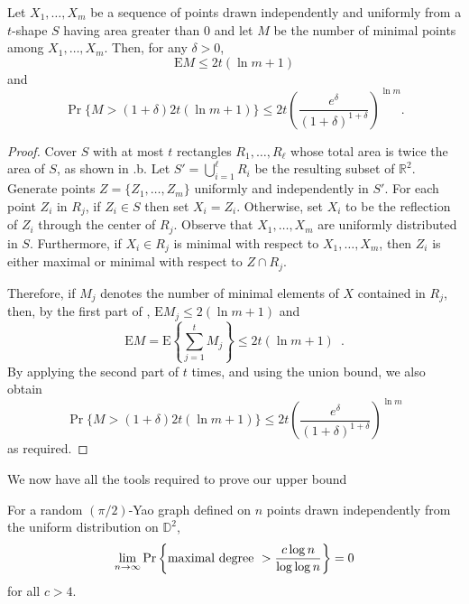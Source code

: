 \documentclass[lotsofwhite,charterfonts]{patmorin}
\newcommand{\RR}{\mathbb{R}}
\newcommand{\D}{\mathbb{D}}
\newcommand{\PROB}{\Pr}
\newcommand{\EXP}{\mathrm{E}}
\begin{document}
\begin{lem}
  Let $X_1,\ldots,X_m$ be a sequence of points drawn independently and
  uniformly from a $t$-shape $S$ having area greater than
  0 and let $M$ be the number of minimal points
  among $X_1,\ldots,X_m$.  Then, for any $\delta >0$,
  \begin{equation}
    \EXP{M} \le 2t(\ln m + 1)
  \end{equation}
  and 
  \begin{equation}
    \PROB\{M>(1+\delta)2t(\ln m+1)\} 
        \le 2t\left(\frac{e^\delta}{(1+\delta)^{1+\delta}}\right)^{\ln m} .
  \end{equation}
\end{lem}

\begin{proof}
Cover $S$ with at most $t$ rectangles $R_1,\ldots,R_\ell$ whose total area
is twice the area of $S$, as shown in .b.  Let
$S'=\bigcup_{i=1}^\ell R_i$ be the resulting subset of $\RR^2$.  Generate
points $Z=\{Z_1,\ldots,Z_m\}$ uniformly and independently in $S'$.  For each
point $Z_i$ in $R_j$, if $Z_i\in S$ then set $X_i=Z_i$.  Otherwise, set
$X_i$ to be the reflection of $Z_i$ through the center of $R_j$.  Observe
that $X_1,\ldots,X_m$ are uniformly distributed in $S$.  Furthermore, if
$X_i\in R_j$ is minimal with respect to $X_1,\ldots,X_m$, then $Z_i$ is either
maximal or minimal with respect to $Z \cap R_j$.

Therefore, if $M_j$ denotes the number of minimal elements of $X$ contained
in $R_j$, then, by the first part of , $\EXP M_j \le
2(\ln m+1)$ and 
\[
     \EXP{M} = \EXP\left\{\sum_{j=1}^t M_j\right\} \le 2t(\ln m + 1)
     \enspace .
\]
By applying the second part of  $t$ times,
and using the union bound, we also obtain
\[
    \PROB\{M>(1+\delta)2t(\ln m+1)\} 
        \le 2t\left(\frac{e^\delta}{(1+\delta)^{1+\delta}}\right)^{\ln m} 
\]
as required.
\end{proof}

We now have all the tools required to prove our upper bound

\begin{thm}
For a random $(\pi/2)$-Yao graph defined on $n$ points drawn
independently from the uniform distribution on
$\D^2$, 
$$
\lim_{n\to\infty} \PROB \left\{ \hbox{\rm maximal degree}~> {c \log n \over
\log \log n} \right\} = 0
$$
for all $c > 4$.
\end{thm}
\end{document}
